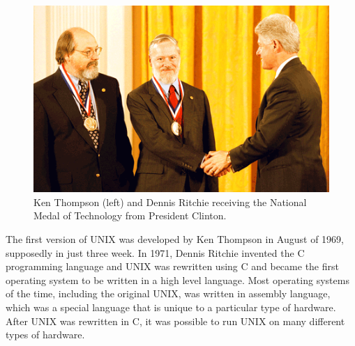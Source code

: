 \begin{frame}
\end{frame}

\begin{frame}
\begin{figure}
\begin{center}\includegraphics[width=0.7\linewidth]{dennis-ken3}\end{center}
\caption{Ken Thompson (left) and Dennis Ritchie receiving the National Medal of
Technology from President Clinton.}
\label{fig:medal}
\end{figure}
\end{frame}

The first version of UNIX was developed by Ken Thompson in August of 1969,
supposedly in just three week. In 1971, Dennis Ritchie invented the C
programming language and UNIX was rewritten using C and became the first
operating system to be written in a high level language. Most operating systems
of the time, including the original UNIX, was written in assembly language,
which was a special language that is unique to a particular type of hardware.
After UNIX was rewritten in C, it was possible to run UNIX on many different
types of hardware.     

